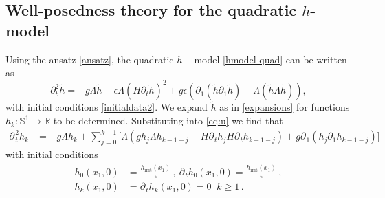 \documentclass[11pt]{article}
\theoremstyle{plain}
\theoremstyle{definition}
\theoremstyle{definition}
\def\bbR{{\mathbb R}}
\def\p{\text{\bf\emph{p}}}
\def\bp{{\partial_1}}
\def\p{{\partial\hspace{1pt}}}
\def\hinit{h_{\operatorname{init}}}
\def\htinit{{\dot h}_{\operatorname{init}}}
\begin{document}
\subsection{Well-posedness theory for the quadratic $h$-model}
Using the ansatz \eqref{ansatz}, the quadratic $h-$model \eqref{hmodel-quad} can be written as
\begin{equation}\label{eq:u}
\partial_t^2 \widetilde{h}=-g\Lambda \widetilde{h}- \epsilon \Lambda(H\partial_t \widetilde{h})^2+g\epsilon\left(\bp(\widetilde{h}\bp \widetilde{h})+\Lambda(\widetilde{h}\Lambda \widetilde{h})\right),
\end{equation}
with initial conditions \eqref{initialdata2}.
We expand $\widetilde{h}$ as in \eqref{expansions} for functions $h_k: \mathbb{S}^1 \to \bbR$ to be determined. Substituting into \eqref{eq:u} we find that
\begin{align}\label{eq:uk}
\p^2_{\!t}h_{k}&=-g\Lambda h_k
+ \sum_{j=0}^{k-1}\big[
\Lambda (gh_{j}\Lambda h_{k-1-j}  - H\p_{\!t}h_{j}H\p_{\!t}h_{k-1-j})  + g\p_{\!1}( h_{j}\bp h_{k-1-j})
\big]
\end{align}
with initial conditions
\begin{align}\label{initialdata3}
h_0(x_1,0)&=\frac{\hinit(x_1)}{\epsilon}\,, \ \p_{\!t}h_0(x_1,0)=\frac{\htinit(x_1)}{\epsilon}\,, \nonumber\\
h_k(x_1,0)&= \p_{\!t}h_k(x_1,0)=0\;\;k\geq1 \,.
\end{align}
\end{document}
